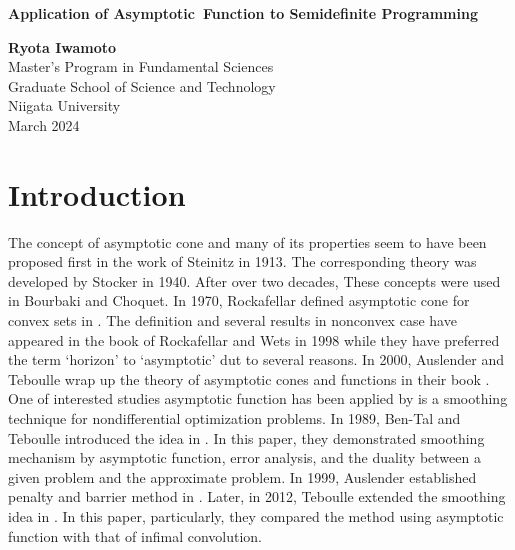 \documentclass[a4paper,11pt, oneside]{book}
\theoremstyle{definition}
\begin{document}
\begin{titlepage}
\begin{center}
\vspace*{10mm}
{\bf \Huge Application of Asymptotic~Function to Semidefinite Programming}
\vspace{80mm}

{\bf \Huge Ryota Iwamoto}\\
\vspace{15mm}
{\LARGE Master's Program in Fundamental Sciences}\\
\vspace{5mm}
{\LARGE Graduate School of Science and Technology}\\
\vspace{5mm}
{\LARGE Niigata University}\\
\vspace{15mm}
{\LARGE March 2024}
\end{center}
\end{titlepage}

\tableofcontents

\chapter{Introduction}
The concept of asymptotic cone and many of its properties seem to have been proposed first in the work of Steinitz in 1913. The corresponding theory was developed by Stocker in 1940. After over two decades, These concepts were used in Bourbaki and Choquet. In 1970, Rockafellar defined asymptotic cone for convex sets in \cite{Rockafellar70}. The definition and several results in nonconvex case have appeared in the book \cite{Rockafellar98} of Rockafellar and Wets in 1998 while they have preferred the term `horizon' to `asymptotic' dut to several reasons. In 2000, Auslender and Teboulle wrap up the theory of asymptotic cones and functions in their book \cite{Auslender03}. One of interested studies asymptotic function has been applied by is a smoothing technique for nondifferential optimization problems. In 1989, Ben-Tal and Teboulle introduced the idea in \cite{BenTalTeboulle89}. In this paper, they demonstrated smoothing mechanism by asymptotic function, error analysis, and the duality between a given problem and the approximate problem. In 1999, Auslender established penalty and barrier method in \cite{Auslender99}. Later, in 2012, Teboulle extended the smoothing idea in \cite{BeckTeboulle12}. In this paper, particularly, they compared the method using asymptotic function with that of infimal convolution.
\end{document}
